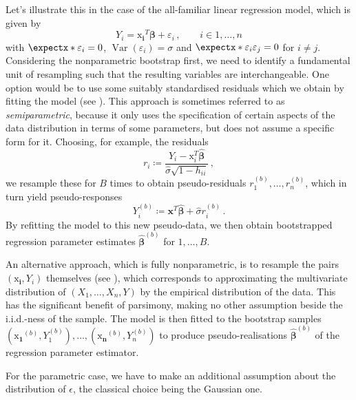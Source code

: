 \documentclass[a4paper]{book}
\begin{document}
Let's illustrate this in the case of the all-familiar linear regression model, which is given by
\begin{equation} \label{eq:linear-model}
  Y_i = \bm{\mathrm{x}_i}^T \bm{\beta} + \varepsilon_i \,, \qquad i \in {1, \dots, n}
\end{equation}
with $\expect{\varepsilon_i} = 0$, $\operatorname{Var}(\varepsilon_i) = \sigma$ and $\expect{\varepsilon_i \varepsilon_j} = 0$ for $i \neq j$. Considering the nonparametric bootstrap first, we need to identify a fundamental unit of resampling such that the resulting variables are interchangeable. One option would be to use some suitably standardised residuals which we obtain by fitting the model (see \cite[Algorithm 6.1]{davison}). This approach is sometimes referred to as \emph{semiparametric}, because it only uses the specification of certain aspects of the data distribution in terms of some parameters, but does not assume a specific form for it. Choosing, for example, the residuals
\begin{equation}
  r_i \coloneqq \frac{Y_i - \bm{\mathrm{x}}^T_i \widehat{\bm{\beta}}}{\widehat{\sigma} \sqrt{1 - h_{ii}}} \,,
\end{equation}
we resample these for $B$ times to obtain pseudo-residuals $r^{(b)}_1, \dots, r^{(b)}_n$, which in turn yield  pseudo-responses
\begin{equation}
  Y_i^{(b)} \coloneqq \mathbf{x}^T \widehat{\bm{\beta}} + \widehat{\sigma} r^{(b)}_i \,.
\end{equation}
By refitting the model to this new pseudo-data, we then obtain bootstrapped regression parameter estimates $\widehat{\bm{\beta}}^{(b)}$ for $1, \dots, B$.

An alternative approach, which is fully nonparametric, is to resample the pairs $(\bm{\mathrm{x}_i}, Y_i)$ themselves (see \cites[Section 9.5]{efron:intro}[Algorithm 6.2]{davison}), which corresponds to approximating the multivariate distribution of $(X_1, \dots, X_n, Y)$ by the empirical distribution of the data. This has the significant benefit of parsimony, making no other assumption beside the i.i.d.-ness of the sample. The model is then fitted to the bootstrap samples $(\bm{\mathrm{x}_1}^{(b)}, Y^{(b)}_1), \dots, (\bm{\mathrm{x}_n}^{(b)}, Y^{(b)}_n)$ to produce pseudo-realisations $\widehat{\bm{\beta}}^{(b)}$ of the regression parameter estimator.

For the parametric case, we have to make an additional assumption about the distribution of $\epsilon$, the classical choice being the Gaussian one.
\end{document}
